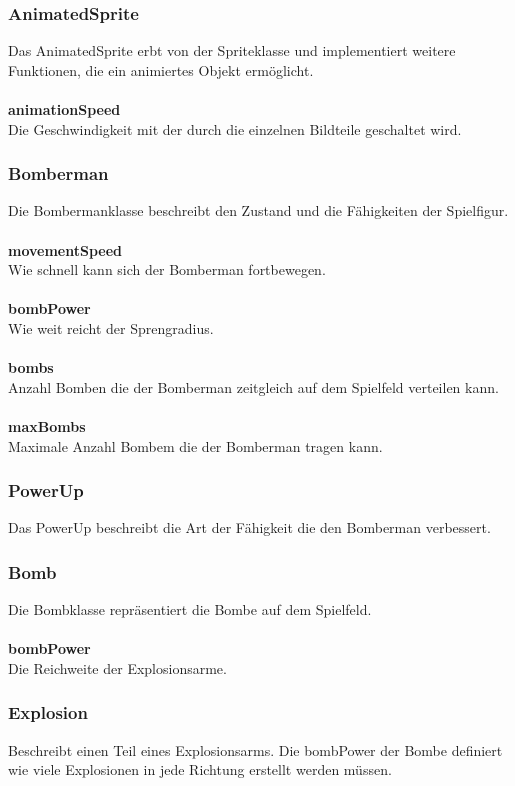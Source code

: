 \documentclass[11pt]{scrartcl}
\begin{document}
\subsubsection{AnimatedSprite}
\label{sec:AnimatedSprite}
Das AnimatedSprite erbt von der Spriteklasse und implementiert weitere Funktionen, die ein animiertes Objekt ermöglicht.
\\\\
\textbf{animationSpeed}\\
Die Geschwindigkeit mit der durch die einzelnen Bildteile geschaltet wird.

\subsubsection{Bomberman}
\label{sec:Bomberman}
Die Bombermanklasse beschreibt den Zustand und die Fähigkeiten der Spielfigur.
\\\\
\textbf{movementSpeed }\\
Wie schnell kann sich der Bomberman fortbewegen.
\\\\
\textbf{bombPower}\\
Wie weit reicht der Sprengradius.
\\\\
\textbf{bombs}\\ 
Anzahl Bomben die der Bomberman zeitgleich auf dem Spielfeld verteilen kann.
\\\\
\textbf{maxBombs}\\
Maximale Anzahl Bombem die der Bomberman tragen kann.

\subsubsection{PowerUp}
\label{sec:PowerUp}
Das PowerUp beschreibt die Art der Fähigkeit die den Bomberman verbessert.

\newpage

\subsubsection{Bomb}
\label{sec:Bomb}
Die Bombklasse repräsentiert die Bombe auf dem Spielfeld.
\\\\
\textbf{bombPower}\\
Die Reichweite der Explosionsarme.

\subsubsection{Explosion}
\label{sec:Explosion}
Beschreibt einen Teil eines Explosionsarms. Die bombPower der Bombe definiert wie viele Explosionen in jede Richtung erstellt werden müssen.
\end{document}
